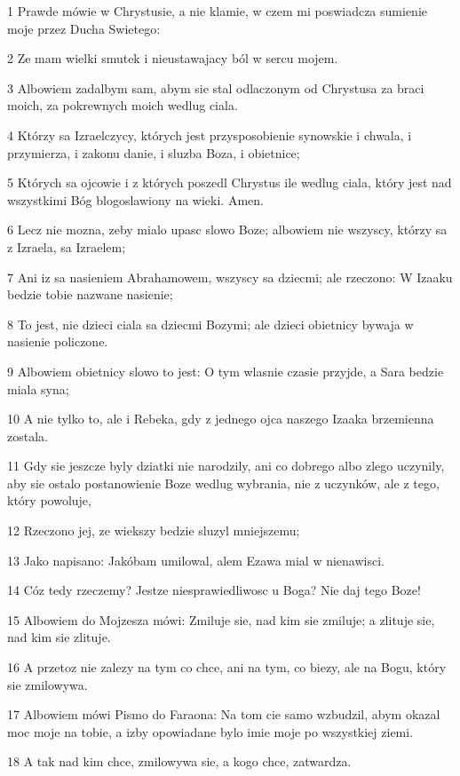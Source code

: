 \par 1 Prawde mówie w Chrystusie, a nie klamie, w czem mi poswiadcza sumienie moje przez Ducha Swietego:
\par 2 Ze mam wielki smutek i nieustawajacy ból w sercu mojem.
\par 3 Albowiem zadalbym sam, abym sie stal odlaczonym od Chrystusa za braci moich, za pokrewnych moich wedlug ciala.
\par 4 Którzy sa Izraelczycy, których jest przysposobienie synowskie i chwala, i przymierza, i zakonu danie, i sluzba Boza, i obietnice;
\par 5 Których sa ojcowie i z których poszedl Chrystus ile wedlug ciala, który jest nad wszystkimi Bóg blogoslawiony na wieki. Amen.
\par 6 Lecz nie mozna, zeby mialo upasc slowo Boze; albowiem nie wszyscy, którzy sa z Izraela, sa Izraelem;
\par 7 Ani iz sa nasieniem Abrahamowem, wszyscy sa dziecmi; ale rzeczono: W Izaaku bedzie tobie nazwane nasienie;
\par 8 To jest, nie dzieci ciala sa dziecmi Bozymi; ale dzieci obietnicy bywaja w nasienie policzone.
\par 9 Albowiem obietnicy slowo to jest: O tym wlasnie czasie przyjde, a Sara bedzie miala syna;
\par 10 A nie tylko to, ale i Rebeka, gdy z jednego ojca naszego Izaaka brzemienna zostala.
\par 11 Gdy sie jeszcze byly dziatki nie narodzily, ani co dobrego albo zlego uczynily, aby sie ostalo postanowienie Boze wedlug wybrania, nie z uczynków, ale z tego, który powoluje,
\par 12 Rzeczono jej, ze wiekszy bedzie sluzyl mniejszemu;
\par 13 Jako napisano: Jakóbam umilowal, alem Ezawa mial w nienawisci.
\par 14 Cóz tedy rzeczemy? Jestze niesprawiedliwosc u Boga? Nie daj tego Boze!
\par 15 Albowiem do Mojzesza mówi: Zmiluje sie, nad kim sie zmiluje; a zlituje sie, nad kim sie zlituje.
\par 16 A przetoz nie zalezy na tym co chce, ani na tym, co biezy, ale na Bogu, który sie zmilowywa.
\par 17 Albowiem mówi Pismo do Faraona: Na tom cie samo wzbudzil, abym okazal moc moje na tobie, a izby opowiadane bylo imie moje po wszystkiej ziemi.
\par 18 A tak nad kim chce, zmilowywa sie, a kogo chce, zatwardza.
